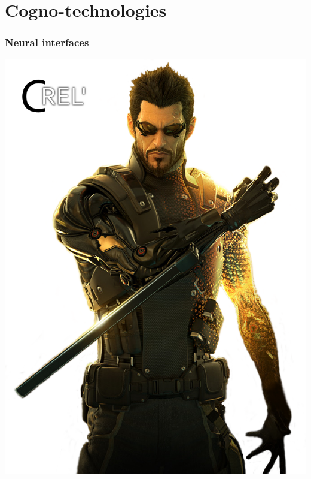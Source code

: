 \documentclass{beamer}
\begin{document}
\section{Cogno-technologies}
\begin{frame}
	\frametitle{Neural interfaces}
	\begin{center}
		\includegraphics[scale=.5]{Deus_ex_Adam_Jensen}
	\end{center}
\end{frame}
\end{document}
